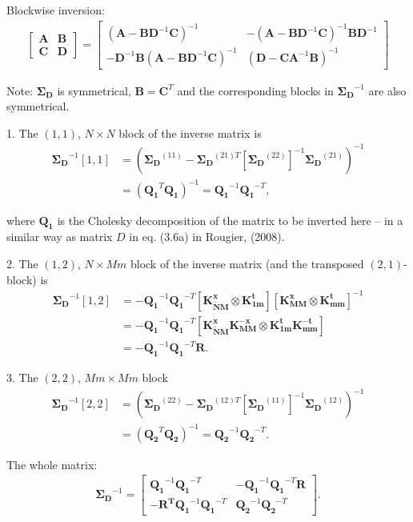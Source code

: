 \documentclass[a4paper,12pt]{article}
\begin{document}
Blockwise inversion:
\begin{align*}
\left[
\begin{matrix}
\bm{A} & \bm{B}\\
\bm{C} & \bm{D}
\end{matrix}
\right] = 
\left[
\begin{matrix}
(\bm{A}  - \bm{B} \bm{D}^{-1} \bm{C} )^{-1} & -(\bm{A}  - \bm{B} \bm{D}^{-1} \bm{C} )^{-1}\bm{B} \bm{D}^{-1} \\
- \bm{D}^{-1}\bm{B}(\bm{A}  - \bm{B} \bm{D}^{-1} \bm{C} )^{-1} & (\bm{D}  - \bm{C} \bm{A}^{-1} \bm{B} )^{-1} 
\end{matrix}
\right]
\end{align*}

Note: $\bm{\Sigma_D}$ is symmetrical, $\bm{B} = \bm{C}^T$ and the corresponding blocks in $\bm{\Sigma_D}^{-1}$ are also symmetrical.

1.  The $(1,1)$, $N\times N$ block of the inverse matrix is 
\begin{align*}
\bm{\Sigma_D}^{-1}[1,1] &= \left(\bm{\Sigma_D}^{(11)} - \bm{\Sigma_D}^{(21)T}\left[\bm{\Sigma_D}^{(22)}\right]^{-1}\bm{\Sigma_D}^{(21)}\right)^{-1} \\ & = (\bm{Q_1}^T\bm{Q_1})^{-1} = \bm{Q_1}^{-1}\bm{Q_1}^{-T},
\end{align*}

where $\bm{Q_1}$ is the Cholesky decomposition of the matrix to be inverted here -- in a similar way as matrix $D$ in eq. (3.6a) in Rougier, (2008).

2. The $(1,2)$, $N\times Mm$  block of the inverse matrix (and the transposed $(2,1)$-block) is
\begin{align*}
\bm{\Sigma_D}^{-1}[1,2] &= - \bm{Q_1}^{-1}\bm{Q_1}^{-T}
\left[ \bm{K^{x}_{\tilde{N}M} \otimes K^t_{1m}}\right]\left[ \bm{K^{x}_{MM} \otimes K^t_{mm}}\right]^{-1} \\ & = - \bm{Q_1}^{-1}\bm{Q_1}^{-T}
\left[ \bm{K^{x}_{\tilde{N}M}}\bm{K^{-x}_{MM}} \otimes  \bm{K^{t}_{1m}}\bm{K^{-t}_{mm}}\right]\\ & = - \bm{Q_1}^{-1}\bm{Q_1}^{-T}\bm{R}.
\end{align*}

3. The $(2,2)$, $Mm\times Mm$ block
\begin{align*}
\bm{\Sigma_D}^{-1}[2,2] &= \left(\bm{\Sigma_D}^{(22)} - \bm{\Sigma_D}^{(12)T}\left[\bm{\Sigma_D}^{(11)}\right]^{-1}\bm{\Sigma_D}^{(12)} \right)^{-1} \\ &= (\bm{Q_2}^T\bm{Q_2})^{-1} = \bm{Q_2}^{-1}\bm{Q_2}^{-T}.
\end{align*}

The whole matrix:
\begin{align*}
\bm{\Sigma_D}^{-1} = \left[
\begin{matrix}
\bm{Q_1}^{-1}\bm{Q_1}^{-T} & -\bm{Q_1}^{-1}\bm{Q_1}^{-T}\bm{R} \\
-\bm{R^T}\bm{Q_1}^{-1}\bm{Q_1}^{-T} & \bm{Q_2}^{-1}\bm{Q_2}^{-T}
\end{matrix}\right].
\end{align*}
\end{document}

